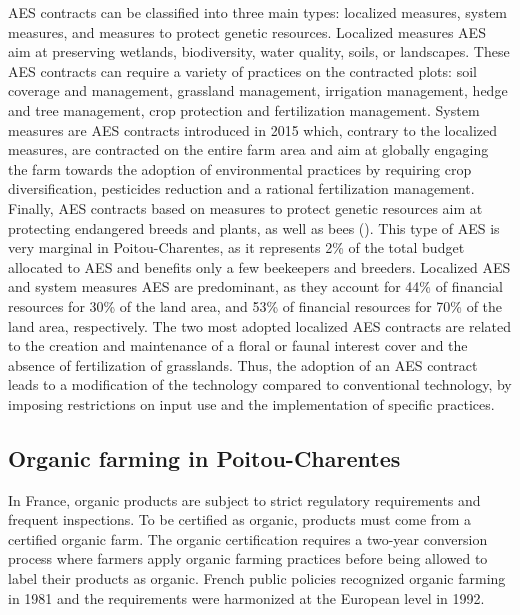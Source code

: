 \begin{Article}
\begin{refsection}[Lassalas]
AES contracts can be classified into three main types: localized
measures, system measures, and measures to protect genetic resources.
Localized measures AES aim at preserving wetlands, biodiversity, water
quality, soils, or landscapes. These AES contracts can require a variety
of practices on the contracted plots: soil coverage and management,
grassland management, irrigation management, hedge and tree management,
crop protection and fertilization management. System measures are AES
contracts introduced in 2015 which, contrary to the localized measures,
are contracted on the entire farm area and aim at globally engaging the
farm towards the adoption of environmental practices by requiring crop
diversification, pesticides reduction and a rational fertilization
management. Finally, AES contracts based on measures to protect genetic
resources aim at protecting endangered breeds and plants, as well as
bees (\textcite{ministere_agriculture_2020}). This type of AES is very marginal in
Poitou-Charentes, as it represents 2\% of the total budget allocated to
AES and benefits only a few beekeepers and breeders. Localized AES and
system measures AES are predominant, as they account for 44\% of
financial resources for 30\% of the land area, and 53\% of financial
resources for 70\% of the land area, respectively. The two most adopted
localized AES contracts are related to the creation and maintenance of a
floral or faunal interest cover and the absence of fertilization of
grasslands. Thus, the adoption of an AES contract leads to a
modification of the technology compared to conventional technology, by
imposing restrictions on input use and the implementation of specific
practices.

\subsection{Organic farming in Poitou-Charentes}

In France, organic products are subject to strict regulatory
requirements and frequent inspections. To be certified as organic,
products must come from a certified organic farm. The organic
certification requires a two-year conversion process where farmers apply
organic farming practices before being allowed to label their products
as organic. French public policies recognized organic farming in 1981
and the requirements were harmonized at the European level in 1992.


\end{refsection}
\end{Article}
